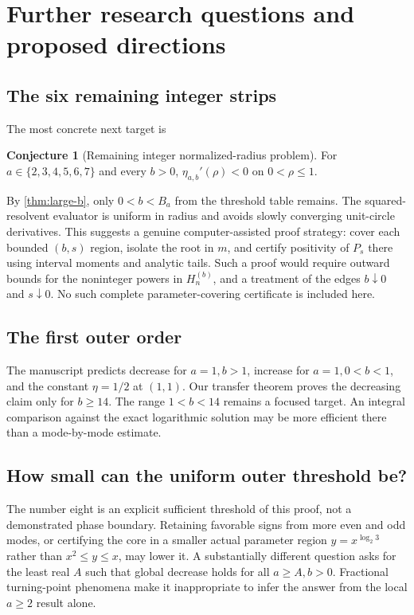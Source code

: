 \documentclass[11pt,letterpaper]{article}
\numberwithin{equation}{section}
\theoremstyle{definition}
\newtheorem{conjecture}[theorem]{Conjecture}
\theoremstyle{remark}
\begin{document}
\section{Further research questions and proposed directions}
\label{sec:future}
\subsection{The six remaining integer strips}
The most concrete next target is
\begin{conjecture}[Remaining integer normalized-radius problem]
For $a\in\{2,3,4,5,6,7\}$ and every $b>0$,
$\eta_{a,b}'(\rho)<0$ on $0<\rho\le1$.
\end{conjecture}
By \cref{thm:large-b}, only $0<b<B_a$ from the threshold table remains.
The squared-resolvent evaluator is uniform in radius and avoids slowly
converging unit-circle derivatives. This suggests a genuine
computer-assisted proof strategy: cover each bounded $(b,s)$ region,
isolate the root in $m$, and certify positivity of $P_s$ there using
interval moments and analytic tails. Such a proof would require
outward bounds for the noninteger powers in $H_n^{(b)}$, and a treatment
of the edges $b\downarrow0$ and $s\downarrow0$. No such complete
parameter-covering certificate is included here.

\subsection{The first outer order}
The manuscript predicts decrease for $a=1,b>1$, increase for
$a=1,0<b<1$, and the constant $\eta=1/2$ at $(1,1)$.
Our transfer theorem proves the decreasing claim only for $b\ge14$.
The range $1<b<14$ remains a focused target. An integral comparison
against the exact logarithmic solution may be more efficient there
than a mode-by-mode estimate.

\subsection{How small can the uniform outer threshold be?}
The number eight is an explicit sufficient threshold of this proof,
not a demonstrated phase boundary. Retaining favorable signs from
more even and odd modes, or certifying the core in a smaller actual
parameter region $y=x^{\log_2 3}$ rather than $x^2\le y\le x$, may lower
it. A substantially different question asks for the least real $A$
such that global decrease holds for all $a\ge A,b>0$. Fractional
turning-point phenomena make it inappropriate to infer the answer
from the local $a\ge2$ result alone.
\end{document}
